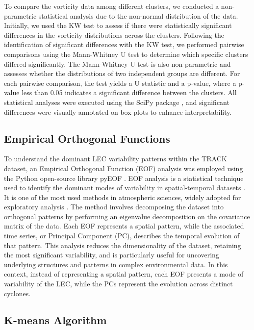 To compare the vorticity data among different clusters, we conducted a non-parametric statistical analysis due to the non-normal distribution of the data. Initially, we used the KW test to assess if there were statistically significant differences in the vorticity distributions across the clusters. Following the identification of significant differences with the KW test, we performed pairwise comparisons using the Mann-Whitney U test to determine which specific clusters differed significantly. The Mann-Whitney U test is also non-parametric and assesses whether the distributions of two independent groups are different. For each pairwise comparison, the test yields a U statistic and a p-value, where a p-value less than 0.05 indicates a significant difference between the clusters. All statistical analyses were executed using the SciPy package \citep{2020SciPy-NMeth}, and significant differences were visually annotated on box plots to enhance interpretability.

\subsection{Empirical Orthogonal Functions}

To understand the dominant LEC variability patterns within the TRACK dataset, an Empirical Orthogonal Function (EOF) analysis was employed using the Python open-source library pyEOF \citep{zheng_2021}. EOF analysis is a statistical technique used to identify the dominant modes of variability in spatial-temporal datasets \citep{fukuoka1951study,lorenz1956empirical}. It is one of the most used methods in atmospheric sciences, widely adopted for exploratory analysis \citep{hannachi2007empirical}. The method involves decomposing the dataset into orthogonal patterns by performing an eigenvalue decomposition on the covariance matrix of the data. Each EOF represents a spatial pattern, while the associated time series, or Principal Component (PC), describes the temporal evolution of that pattern. This analysis reduces the dimensionality of the dataset, retaining the most significant variability, and is particularly useful for uncovering underlying structures and patterns in complex environmental data. In this context, instead of representing a spatial pattern, each EOF presents a mode of variability of the LEC, while the PCs represent the evolution across distinct cyclones.

\subsection{K-means Algorithm}

